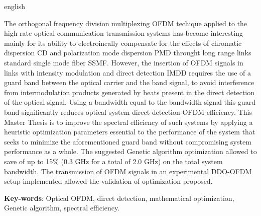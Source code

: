 \begin{resumo}[Abstract]
 \begin{otherlanguage*}{english}

The orthogonal frequency division multiplexing OFDM techique applied to the high
rate optical communication transmission systems has become interesting mainly
for its ability to electroincally compensate for the effects of chromatic
dispersion CD and polarization mode dispersion PMD throught long range links
standard single mode fiber SSMF. However, the insertion of OFDM signals in links
with intensity modulation and direct detection IMDD requires the use of a guard
band between the optical carrier and the band signal, to avoid interference from
intermodulation products generated by beats present in the direct detection of
the optical signal. Using a bandwidth equal to the bandwidth signal this guard
band significantly reduces optical system direct detection OFDM efficiency. This
Master Thesis is to improve the spectral efficiency of such systems by applying
a heuristic optimization parameters essential to the performance of the system
that seeks to minimize the aforementioned guard band without compromising system
performance as a whole. The suggested Genetic algorithm optimization allowed to
save of up to 15\% (0.3 GHz for a total of 2.0 GHz) on the total system
bandwidth. The transmission of OFDM signals in an experimental DDO-OFDM setup
implemented allowed the validation of optimization proposed.

\vspace{\onelineskip}
\noindent 
\textbf{Key-words}: Optical OFDM, direct detection, mathematical
optimization, Genetic algorithm, spectral efficiency.
 \end{otherlanguage*}
\end{resumo}
